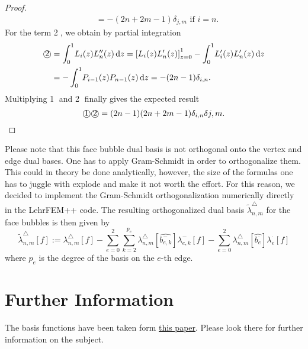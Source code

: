 \documentclass[10pt,a4paper]{article}
\begin{document}
\begin{proof}
\begin{align*}
            &= -(2n+2m-1)\delta_{j,m} \mbox{ if } i = n.
        \end{align*}
        For the term \textcircled{2}, we obtain by partial integration
        \begin{align*}
            \text{\textcircled{2}} &= \int_0^1\! L_i(z)L_n''(z) \,\mathrm{d}z = \left[ L_i(z)L_n'(z) \right]_{z=0}^1 - \int_0^1\! L_i'(z)L_n'(z) \,\mathrm{d}z \\
            &= -\int_0^1\! P_{i-1}(z)P_{n-1}(z) \,\mathrm{d}z = -(2n-1)\delta_{i,n}.
        \end{align*}
        Multiplying \textcircled{1} and \textcircled{2} finally gives the expected result
        \begin{equation*}
            \text{\textcircled{1}}\text{\textcircled{2}} = (2n-1)(2n+2m-1)\delta_{i,n}\delta{j,m}.
        \end{equation*}
    \end{proof}
    
    Please note that this face bubble dual basis is not orthogonal onto the vertex and edge dual bases. One has to apply Gram-Schmidt in order to orthogonalize them. This could in theory be done analytically, however, the size of the formulas one has to juggle with explode and make it not worth the effort. For this reason, we decided to implement the Gram-Schmidt orthogonalization numerically directly in the LehrFEM++ code. The resulting orthogonalized dual basis $\tilde{\lambda}_{n,m}^{\triangle}$ for the face bubbles is then given by
    \begin{equation*}
        \tilde{\lambda}_{n,m}^{\triangle}[f] := \lambda_{n,m}^{\triangle}[f] - \sum_{e=0}^2 \sum_{k=2}^{p_e} \lambda_{n,m}^{\triangle}[\widehat{b_{e,k}^{-}}]\lambda_{e,k}^{-}[f] - \sum_{e=0}^2 \lambda_{n,m}^{\triangle}[\widehat{b_e^{\cdot}}]\lambda_e^{\cdot}[f]
    \end{equation*}
    where $p_e$ is the degree of the basis on the $e$-th edge.
    
\section{Further Information}
    
    The basis functions have been taken form \href{https://arxiv.org/pdf/1504.03025.pdf}{this paper}. Please look there for further information on the subject. 

    
\end{document}
